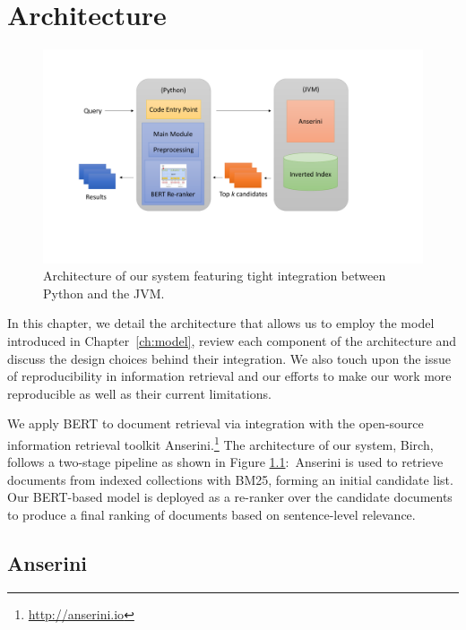 \chapter{Architecture}
\label{ch:arch}

\begin{figure}[b!]
\centering
  \includegraphics[width=5in]{figures/architecture.pdf}
\caption{Architecture of our system featuring tight integration between Python and the JVM.}
\label{fig:arch}
\end{figure}

In this chapter, we detail the architecture that allows us to employ the model introduced in Chapter~\ref{ch:model}, review each component of the architecture and discuss the design choices behind their integration.
We also touch upon the issue of reproducibility in information retrieval and our efforts to make our work more reproducible as well as their current limitations.

We apply BERT to document retrieval via integration with the open-source information retrieval toolkit Anserini.\footnote{\url{http://anserini.io}}
The architecture of our system, Birch, follows a two-stage pipeline as shown in Figure \ref{fig:arch}:\
Anserini is used to retrieve documents from indexed collections with BM25, forming an initial candidate list.
Our BERT-based model is deployed as a re-ranker over the candidate documents to produce a final ranking of documents based on sentence-level relevance.

\section{Anserini}

